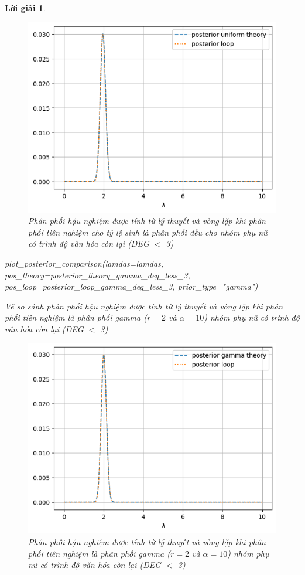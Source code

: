 \documentclass[14pt, a4paper]{article}
\theoremstyle{sltheorem}
\theoremstyle{soltheorem}
\newtheorem*{loigiai}{Lời giải}
\begin{document}
\begin{loigiai}
\begin{enumerate}
        \begin{figure}[h!]
            \centering
            \includegraphics[width=0.6\linewidth]{figures/posterior_loop_theory_uniform_deg_less_3.png}
            \caption{Phân phối hậu nghiệm được tính từ lý thuyết và vòng lặp khi phân phối tiên nghiệm cho tỷ lệ sinh là phân phối đều cho nhóm phụ nữ có trình độ văn hóa còn lại (DEG $<$ 3)}
            \label{fig:posterior_loop_theory_uniform_deg_less_3}
        \end{figure}

        \begin{python}
plot_posterior_comparison(lamdas=lamdas, pos_theory=posterior_theory_gamma_deg_less_3, pos_loop=posterior_loop_gamma_deg_less_3, prior_type="gamma")
        \end{python}

        Vẽ so sánh phân phối hậu nghiệm được tính từ lý thuyết và vòng lặp khi phân phối tiên nghiệm là phân phối gamma ($r=2$ và $\alpha=10$) nhóm phụ nữ có trình độ văn hóa còn lại (DEG $<$ 3)

        \begin{figure}[h!]
            \centering
            \includegraphics[width=0.6\linewidth]{figures/posterior_loop_theory_gamma_deg_less_3.png}
            \caption{Phân phối hậu nghiệm được tính từ lý thuyết và vòng lặp khi phân phối tiên nghiệm là phân phối gamma ($r=2$ và $\alpha=10$) nhóm phụ nữ có trình độ văn hóa còn lại (DEG $<$ 3)}
            \label{fig:posterior_loop_theory_gamma_deg_less_3}
        \end{figure}


\end{enumerate}
\end{loigiai}
\end{document}
